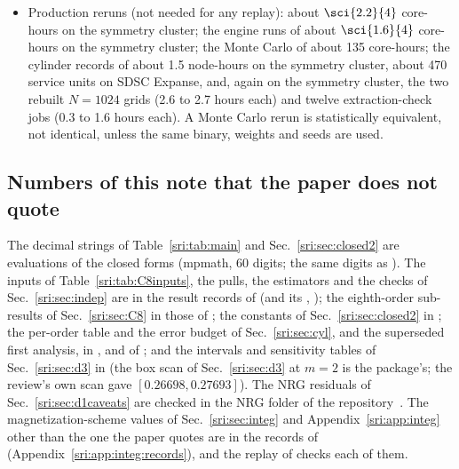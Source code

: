\begin{itemize}
\item Production reruns (not needed for any replay):  about $\sci{2.2}{4}$ core-hours on the symmetry
 cluster; the engine runs of  about $\sci{1.6}{4}$ core-hours on the symmetry cluster; the Monte Carlo of  about 135 core-hours; the cylinder records of 
 about 1.5 node-hours on the symmetry cluster, about 470 service units on SDSC Expanse, and, again on the symmetry
 cluster, the two rebuilt $N=1024$ grids (2.6 to 2.7 hours each) and twelve extraction-check jobs (0.3 to 1.6 hours
 each). A Monte Carlo rerun is statistically equivalent, not identical, unless the same binary, weights and seeds are
 used.
\end{itemize}

\subsection{Numbers of this note that the paper does not quote}
The decimal strings of Table~\ref{sri:tab:main} and Sec.~\ref{sri:sec:closed2} are evaluations of the closed forms
(mpmath, 60 digits; the same digits as ). The inputs of Table~\ref{sri:tab:C8inputs}, the
pulls, the estimators and the checks of Sec.~\ref{sri:sec:indep} are in the result records of  (and
its , ); the eighth-order sub-results of Sec.~\ref{sri:sec:C8} in those of
; the constants of Sec.~\ref{sri:sec:closed2} in ; the
per-order table and the error budget of Sec.~\ref{sri:sec:cyl}, and the superseded first analysis, in
,  and  of
; and the intervals and sensitivity tables of Sec.~\ref{sri:sec:d3} in
 (the box scan of Sec.~\ref{sri:sec:d3} at $m=2$ is the package's; the review's own scan
gave $[0.26698,0.27693]$). The NRG residuals of Sec.~\ref{sri:sec:d1caveats} are checked in the NRG folder of the
repository~\cite{sri:NRGnote}. The magnetization-scheme values of Sec.~\ref{sri:sec:integ} and Appendix~\ref{sri:app:integ}
other than the one the paper quotes are in the records of 
(Appendix~\ref{sri:app:integ:records}), and the replay of  checks each of them.

